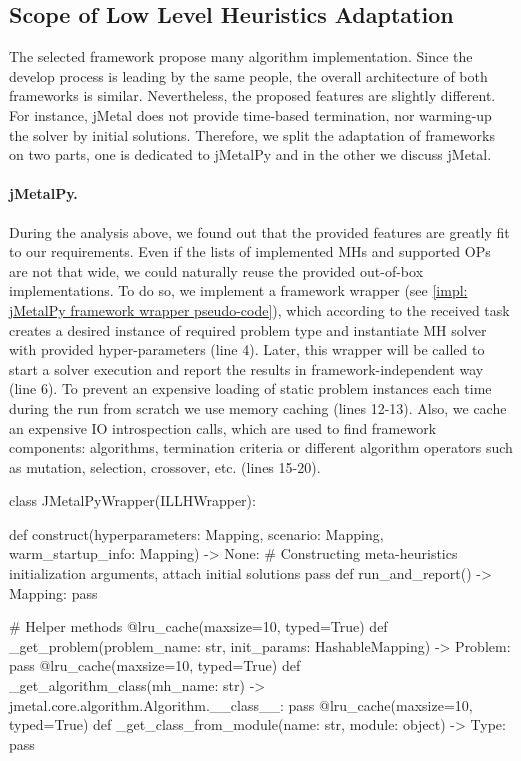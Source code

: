 \subsection{Scope of Low Level Heuristics Adaptation}
The selected framework propose many algorithm implementation. Since the develop process is leading by the same people, the overall architecture of both frameworks is similar. Nevertheless, the proposed features are slightly different. For instance, jMetal does not provide time-based termination, nor warming-up the solver by initial solutions. Therefore, we split the adaptation  of frameworks on two parts, one is dedicated to jMetalPy and in the other we discuss jMetal.

\paragraph{jMetalPy.} During the analysis above, we found out that the provided features are greatly fit to our requirements. Even if the lists of implemented MHs and supported OPs are not that wide, we could naturally reuse the provided out-of-box implementations. To do so, we implement a framework wrapper (see \cref{impl: jMetalPy framework wrapper pseudo-code}), which according to the received task creates a desired instance of required problem type and instantiate MH solver with provided hyper-parameters (line 4). Later, this wrapper will be called to start a solver execution and report the results in framework-independent way (line 6). To prevent an expensive loading of static problem instances each time during the run from scratch we use memory caching (lines 12-13). Also, we cache an expensive IO introspection calls, which are used to find framework components: algorithms, termination criteria or different algorithm operators such as mutation, selection, crossover, etc. (lines 15-20).

\begin{code}[language=Python, caption=jMetalPy framework wrapper pseudo-code., label=impl: jMetalPy framework wrapper pseudo-code]
class JMetalPyWrapper(ILLHWrapper):

	def construct(hyperparameters: Mapping, scenario: Mapping, warm_startup_info: Mapping) -> None:
		# Constructing meta-heuristics initialization arguments, attach initial solutions
		pass
	def run_and_report() -> Mapping:
		pass

	# Helper methods
	@lru_cache(maxsize=10, typed=True)
	def _get_problem(problem_name: str, init_params: HashableMapping) -> Problem:
		pass
	@lru_cache(maxsize=10, typed=True)
	def _get_algorithm_class(mh_name: str) -> jmetal.core.algorithm.Algorithm.__class__:
		pass
	@lru_cache(maxsize=10, typed=True)
	def _get_class_from_module(name: str, module: object) -> Type:
		pass
\end{code}

